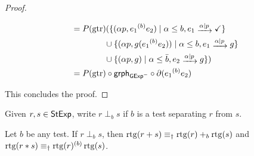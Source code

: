 \documentclass[orivec,envcountsect,envcountsame]{llncs}
\begin{document}
\begin{proof}
\begin{itemize}
\begin{align*}
			&= P(\gtr)( \{(\alpha p, e_1 \while b e_2) \mid \alpha\le b, e_1 \tr{\alpha \mid p} \checkmark\}\\
			&\hspace*{4em}\cup \{(\alpha p, g(e_1 \while b e_2)) \mid \alpha\le b, e_1 \tr{\alpha \mid p} g\} \\
			&\hspace*{4em}\cup \{(\alpha p, g) \mid \alpha\le \bar b, e_2 \tr{\alpha \mid p} g\}) \\
			&= P(\gtr) \circ \grph_{\GExp^-} \circ \partial(e_1\while b e_2)
		\end{align*}
	\end{itemize}
	This concludes the proof.
\end{proof}

Given \(r, s \in \mathsf{StExp}\), write \(r \perp_b s\) if \(b\) is a test separating \(r\) from \(s\).

\begin{lemma}\label{lem:arbitrary seperation}
	Let \(b\) be any test.
	If \(r \perp_b s\), then \(\operatorname{rtg}(r + s) \equiv_\dagger \operatorname{rtg}(r) +_b \operatorname{rtg}(s)\) and \(\operatorname{rtg}(r * s) \equiv_\dagger \operatorname{rtg}(r) ^{(b)} \operatorname{rtg}(s)\).
\end{lemma}
\end{document}
